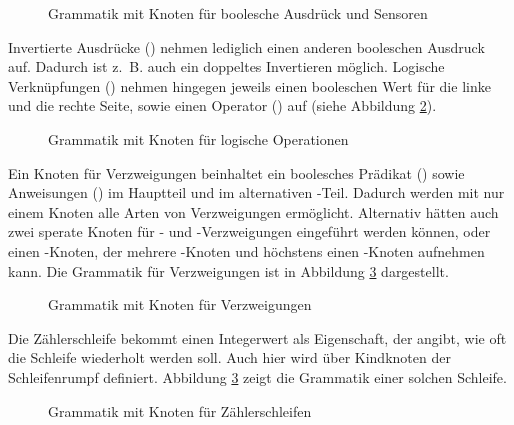\begin{figure}[h]
  
  \caption{Grammatik mit Knoten für boolesche Ausdrück und Sensoren}
  \label{fig:implementation:datastructure:grammar:4}
\end{figure}

Invertierte Ausdrücke () nehmen lediglich einen anderen booleschen Ausdruck auf. Dadurch ist z.~B. auch ein doppeltes Invertieren möglich. Logische Verknüpfungen () nehmen hingegen jeweils einen booleschen Wert für die linke und die rechte Seite, sowie einen Operator () auf (siehe Abbildung \ref{fig:implementation:datastructure:grammar:5}).

\begin{figure}[h]
  
  \caption{Grammatik mit Knoten für logische Operationen}
  \label{fig:implementation:datastructure:grammar:5}
\end{figure}

Ein Knoten für Verzweigungen beinhaltet ein boolesches Prädikat () sowie Anweisungen () im Hauptteil und im alternativen -Teil. Dadurch werden mit nur einem Knoten alle Arten von Verzweigungen ermöglicht. Alternativ hätten auch zwei sperate Knoten für - und -Verzweigungen eingeführt werden können, oder einen -Knoten, der mehrere -Knoten und höchstens einen -Knoten aufnehmen kann. Die Grammatik für Verzweigungen ist in Abbildung \ref{fig:implementation:datastructure:grammar:6} dargestellt.

\begin{figure}[h]
  
  \caption{Grammatik mit Knoten für Verzweigungen}
  \label{fig:implementation:datastructure:grammar:6}
\end{figure}

Die Zählerschleife bekommt einen Integerwert als Eigenschaft, der angibt, wie oft die Schleife wiederholt werden soll. Auch hier wird über Kindknoten der Schleifenrumpf definiert. Abbildung \ref{fig:implementation:datastructure:grammar:6} zeigt die Grammatik einer solchen Schleife.

\begin{figure}[h]
  
  \caption{Grammatik mit Knoten für Zählerschleifen}
  \label{fig:implementation:datastructure:grammar:7}
\end{figure}

